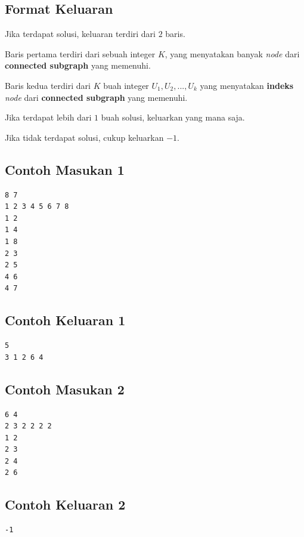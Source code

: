 \documentclass{article}
\begin{document}
\subsection*{Format Keluaran}
Jika terdapat solusi, keluaran terdiri dari $2$ baris.

Baris pertama terdiri dari sebuah integer $K$, yang menyatakan banyak \textit{node} dari \textbf{connected subgraph} yang memenuhi.

Baris kedua terdiri dari $K$ buah integer $U_1,U_2,...,U_k$ yang menyatakan \textbf{indeks} \textit{node} dari \textbf{connected subgraph} yang memenuhi.

Jika terdapat lebih dari $1$ buah solusi, keluarkan yang mana saja. 

Jika tidak terdapat solusi, cukup keluarkan $-1$.
\pagebreak
\begin{multicols}{2}
\subsection*{Contoh Masukan 1}
\begin{lstlisting}
8 7
1 2 3 4 5 6 7 8
1 2
1 4
1 8
2 3
2 5
4 6
4 7
\end{lstlisting}
\columnbreak
\subsection*{Contoh Keluaran 1}
\begin{lstlisting}
5
3 1 2 6 4
\end{lstlisting}
\vfill
\null
\end{multicols}

\begin{multicols}{2}
\subsection*{Contoh Masukan 2}
\begin{lstlisting}
6 4
2 3 2 2 2 2
1 2
2 3
2 4
2 6
\end{lstlisting}
\columnbreak
\subsection*{Contoh Keluaran 2}
\begin{lstlisting}
-1
\end{lstlisting}
\vfill
\null
\end{multicols}
\end{document}

